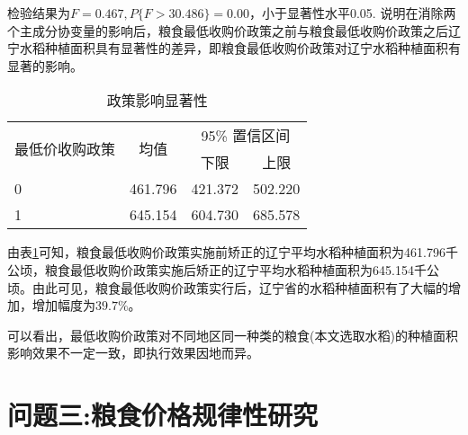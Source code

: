 \documentclass[withoutpreface,bwprint]{cumcmthesis} %
\begin{document}
检验结果为$F=0.467,P\{F>30.486\}=0.00$，小于显著性水平0.05. 说明在消除两个主成分协变量的影响后，粮食最低收购价政策之前与粮食最低收购价政策之后辽宁水稻种植面积具有显著性的差异，即粮食最低收购价政策对辽宁水稻种植面积有显著的影响。\par
\begin{table}[htbp]
  \centering
  \caption{政策影响显著性}
    \begin{tabular}{|p{10.945em}|c|c|c|}
    \toprule
    \multirow{2}[4]{*}{最低价收购政策} & \multicolumn{1}{c|}{\multirow{2}[4]{*}{均值}} & \multicolumn{2}{p{9.39em}|}{95\% 置信区间} \\
\cmidrule{3-4}    \multicolumn{1}{|c|}{} &       & \multicolumn{1}{p{5.055em}|}{下限} & \multicolumn{1}{p{4.335em}|}{上限} \\
    \midrule
    0     & 461.796 & 421.372 & 502.220 \\
    1     & 645.154 & 604.730 & 685.578 \\
    \bottomrule
    \end{tabular}%
  \label{xzx}%
\end{table}%
由表\ref{xzx}可知，粮食最低收购价政策实施前矫正的辽宁平均水稻种植面积为461.796千公顷，粮食最低收购价政策实施后矫正的辽宁平均水稻种植面积为645.154千公顷。由此可见，粮食最低收购价政策实行后，辽宁省的水稻种植面积有了大幅的增加，增加幅度为$39.7\%$。\par
可以看出，最低收购价政策对不同地区同一种类的粮食(本文选取水稻)的种植面积影响效果不一定一致，即执行效果因地而异。\par

		\section{问题三:粮食价格规律性研究}
\end{document}
